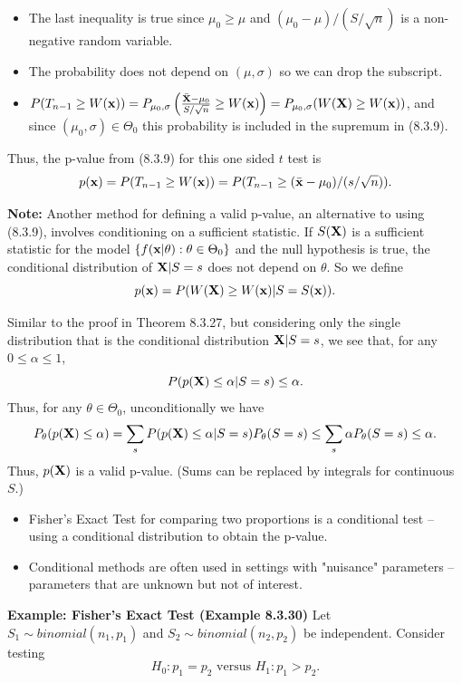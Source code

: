 \documentclass[11pt,]{article}
\def\bx{{\bf x}}
\def\bX{{\bf X}}
\def\bxbar{\bar{ \bx}}
\def\bXbar{\bar{ \bX}}
\def\bxbar{\bar{\bx}}
\begin{document}
\begin{itemize}
\item The last inequality is true since $\mu_0 \geq \mu$ and $(\mu_0 - \mu)/(S/\sqrt{n})$ is a non-negative random variable. \item The probability does not depend on $(\mu, \sigma)$ so we can drop the subscript.
\item $P(T_{n-1} \geq W(\bx)) = P_{\mu_0, \sigma}\left(  \frac{ \bXbar - \mu_0}{S/\sqrt{n}}  \geq W(\bx) \right) = P_{\mu_0, \sigma}(W(\bX) \geq W(\bx))$, and since $(\mu_0, \sigma)\in \Theta_0$ this probability is included in the supremum in (8.3.9).
\end{itemize}

Thus, the p-value from (8.3.9) for this one sided \(t\) test is
\[p(\bx) = P(T_{n-1} \geq W(\bx)) = P(T_{n-1} \geq (\bxbar - \mu_0)/(s/\sqrt{n})).\]

\noindent \textbf{Note:} Another method for defining a valid p-value, an
alternative to using (8.3.9), involves conditioning on a sufficient
statistic. If \(S(\bX)\) is a sufficient statistic for the model
\(\{ f(\bx|\theta): \theta \in \Theta_0\}\) and the null hypothesis is
true, the conditional distribution of \(\bX | S=s\) does not depend on
\(\theta\). So we define
\[p(\bx) = P(W(\bX) \geq W(\bx) | S = S(\bx)).\]

Similar to the proof in Theorem 8.3.27, but considering only the single
distribution that is the conditional distribution \(\bX | S=s\), we see
that, for any \(0 \leq \alpha \leq 1\),
\[P(p(\bX) \leq \alpha | S = s) \leq \alpha.\] Thus, for any
\(\theta \in \Theta_0\), unconditionally we have
\[P_\theta(p(\bX) \leq \alpha) = \sum_s P(p(\bX) \leq \alpha | S = s) P_\theta(S = s) \leq \sum_s \alpha P_\theta (S = s) \leq \alpha.\]
Thus, \(p(\bX)\) is a valid p-value. (Sums can be replaced by integrals
for continuous \(S\).)

\begin{itemize}
\item Fisher's Exact Test for comparing two proportions is a conditional test -- using a conditional distribution to obtain the p-value.
\item Conditional methods are often used in settings with "nuisance" parameters -- parameters that are unknown but not of interest.
\end{itemize}

\noindent \textbf{Example: Fisher's Exact Test (Example 8.3.30)} Let
\(S_1 \sim binomial(n_1,p_1)\) and \(S_2 \sim binomial(n_2, p_2)\) be
independent. Consider testing
\[H_0: p_1 = p_2 \mbox{ versus } H_1: p_1 > p_2.\]
\end{document}
